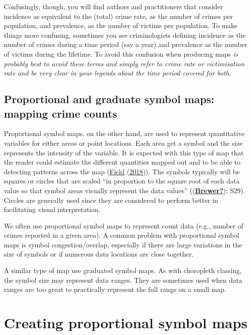 \documentclass[
]{book}
\begin{document}
Confusingly, though, you will find authors and practitioners that consider incidence as equivalent to the (total) crime rate, as the number of crimes per population, and prevalence, as the number of victims per population. To make things more confusing, sometimes you see criminologists defining incidence as the number of crimes during a time period (say a year) and prevalence as the number of victims during the lifetime. To avoid this confusion when producing maps \emph{is probably best to avoid these terms and simply refer to crime rate or victimisation rate and be very clear in your legends about the time period covered for both}.

\hypertarget{proportional-and-graduate-symbol-maps-mapping-crime-counts}{%
\subsection{Proportional and graduate symbol maps: mapping crime counts}\label{proportional-and-graduate-symbol-maps-mapping-crime-counts}}

Proportional symbol maps, on the other hand, are used to represent quantitative variables for either areas or point locations. Each area get a symbol and the size represents the intensity of the variable. It is expected with this type of map that the reader could estimate the different quantities mapped out and to be able to detecting patterns across the map (\protect\hyperlink{ref-Field_2018}{Field} (\protect\hyperlink{ref-Field_2018}{2018})). The symbols typically will be squares or circles that are scaled ``in proportion to the square root of each data value so that symbol areas visually represent the data values'' ((\protect\hyperlink{ref-Brewer}{\textbf{Brewer?}}): S29). Circles are generally used since they are considered to perform better in facilitating visual interpretation.

We often use proportional symbol maps to represent count data (e.g., number of crimes reported in a given area). A common problem with proportional symbol maps is symbol congestion/overlap, especially if there are large variations in the size of symbols or if numerous data locations are close together.

A similar type of map use graduated symbol maps. As with choropleth classing, the symbol size may represent data ranges. They are sometimes used when data ranges are too great to practically represent the full range on a small map.

\hypertarget{creating-proportional-symbol-maps}{%
\section{Creating proportional symbol maps}\label{creating-proportional-symbol-maps}}
\end{document}
